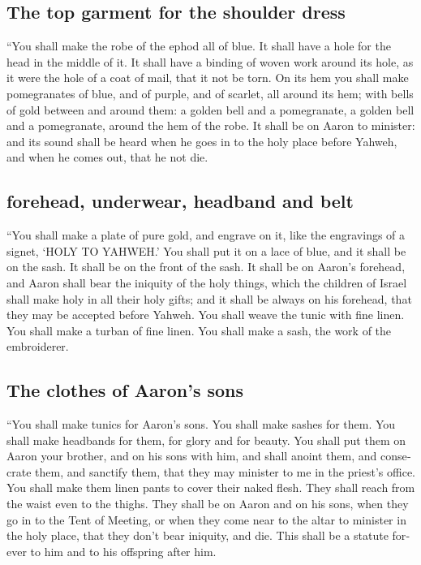 \begin{paracol}{2}
\begin{otherlanguage}{english}
\hypertarget{the-top-garment-for-the-shoulder-dress}{%
\subsection{The top garment for the shoulder
dress}\label{the-top-garment-for-the-shoulder-dress}}

 ``You shall make the robe of the ephod all of blue.
 It shall have a hole for the head in the middle of it.
It shall have a binding of woven work around its hole, as it were the
hole of a coat of mail, that it not be torn.  On its hem
you shall make pomegranates of blue, and of purple, and of scarlet, all
around its hem; with bells of gold between and around them:
 a golden bell and a pomegranate, a golden bell and a
pomegranate, around the hem of the robe.  It shall be on
Aaron to minister: and its sound shall be heard when he goes in to the
holy place before Yahweh, and when he comes out, that he not die.

\hypertarget{forehead-underwear-headband-and-belt}{%
\subsection{forehead, underwear, headband and
belt}\label{forehead-underwear-headband-and-belt}}

 ``You shall make a plate of pure gold, and engrave on
it, like the engravings of a signet, `HOLY TO YAHWEH.' 
You shall put it on a lace of blue, and it shall be on the sash. It
shall be on the front of the sash.  It shall be on
Aaron's forehead, and Aaron shall bear the iniquity of the holy things,
which the children of Israel shall make holy in all their holy gifts;
and it shall be always on his forehead, that they may be accepted before
Yahweh.  You shall weave the tunic with fine linen. You
shall make a turban of fine linen. You shall make a sash, the work of
the embroiderer.

\hypertarget{the-clothes-of-aarons-sons}{%
\subsection{The clothes of Aaron's
sons}\label{the-clothes-of-aarons-sons}}

 ``You shall make tunics for Aaron's sons. You shall make
sashes for them. You shall make headbands for them, for glory and for
beauty.  You shall put them on Aaron your brother, and on
his sons with him, and shall anoint them, and consecrate them, and
sanctify them, that they may minister to me in the priest's office.
 You shall make them linen pants to cover their naked
flesh. They shall reach from the waist even to the thighs.
 They shall be on Aaron and on his sons, when they go in
to the Tent of Meeting, or when they come near to the altar to minister
in the holy place, that they don't bear iniquity, and die. This shall be
a statute forever to him and to his offspring after him.


\end{otherlanguage}
\end{paracol}

